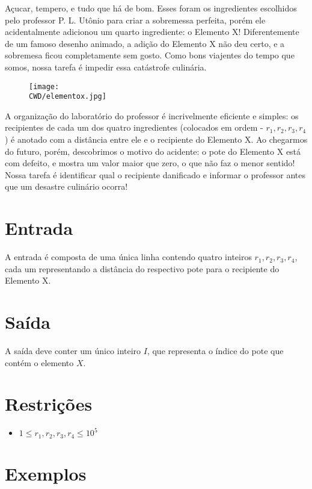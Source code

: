 Açucar, tempero, e tudo que há de bom. Esses foram os ingredientes escolhidos pelo professor P. L. Utônio para criar a sobremessa perfeita,
porém ele acidentalmente adicionou um quarto ingrediente: o Elemento X! Diferentemente de um famoso desenho animado, a adição do Elemento X não deu certo,
e a sobremesa ficou completamente sem gosto. Como bons viajentes do tempo que somos, nossa tarefa é impedir essa catástrofe culinária.

\begin{figure}[H]
    \centering
    \texttt{[image: \\CWD/elementox.jpg]}
\end{figure}

A organização do laboratório do professor é incrivelmente eficiente e simples: os recipientes de cada um dos quatro ingredientes (colocados em ordem - $r_1, r_2, r_3, r_4$)
é anotado com a distância entre ele e o recipiente do Elemento X. Ao chegarmos do futuro, porém, descobrimos o motivo do acidente:
o pote do Elemento X está com defeito, e mostra um valor maior que zero, o que não faz o menor sentido!
Nossa tarefa é identificar qual o recipiente danificado e informar o professor antes que um desastre culinário ocorra!

\section*{Entrada}

A entrada é composta de uma única linha contendo quatro inteiros $r_1, r_2, r_3, r_4$, cada um representando a distância do respectivo pote
para o recipiente do Elemento X.

\section*{Saída}

A saída deve conter um único inteiro $I$, que representa o índice do pote que contém o elemento $X$.

\section*{Restrições}

\begin{itemize}
\item $ 1 \leq r_1, r_2, r_3, r_4 \leq 10^5$
\end{itemize}

\section*{Exemplos}

\sampleio
